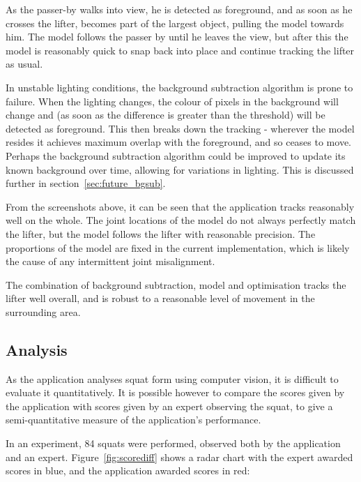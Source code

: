 As the passer-by walks into view, he is detected as foreground, and as soon as he crosses the lifter, becomes part of the largest object, pulling the model towards him. The model follows the passer by until he leaves the view, but after this the model is reasonably quick to snap back into place and continue tracking the lifter as usual.

In unstable lighting conditions, the background subtraction algorithm is prone to failure. When the lighting changes, the colour of pixels in the background will change and (as soon as the difference is greater than the threshold) will be detected as foreground. This then breaks down the tracking - wherever the model resides it achieves maximum overlap with the foreground, and so ceases to move. Perhaps the background subtraction algorithm could be improved to update its known background over time, allowing for variations in lighting. This is discussed further in section~\ref{sec:future_bgsub}.

From the screenshots above, it can be seen that the application tracks reasonably well on the whole. The joint locations of the model do not always perfectly match the lifter, but the model follows the lifter with reasonable precision. The proportions of the model are fixed in the current implementation, which is likely the cause of any intermittent joint misalignment.

The combination of background subtraction, model and optimisation tracks the lifter well overall, and is robust to a reasonable level of movement in the surrounding area.

\subsection{Analysis}
\label{sec:analysis_eval}

As the application analyses squat form using computer vision, it is difficult to evaluate it quantitatively. It is possible however to compare the scores given by the application with scores given by an expert observing the squat, to give a semi-quantitative measure of the application's performance.

In an experiment, 84 squats were performed, observed both by the application and an expert. Figure~\ref{fig:scorediff} shows a radar chart with the expert awarded scores in blue, and the application awarded scores in red:

